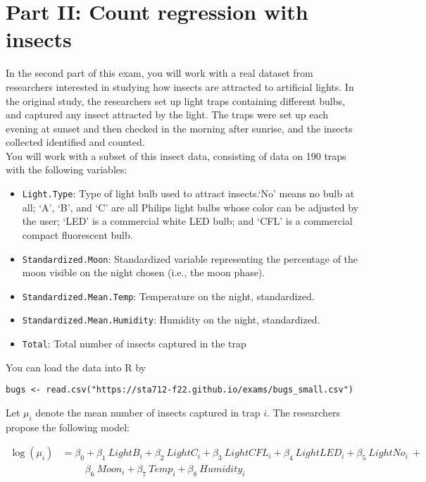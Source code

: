 \documentclass[11pt]{article}
\begin{document}
\newpage

\section*{Part II: Count regression with insects}

In the second part of this exam, you will work with a real dataset from researchers interested in studying how insects are attracted to artificial lights. In the original study, the researchers set up light traps containing different bulbs, and captured any insect attracted by the light. The traps were set up each evening at sunset and then checked in the morning after sunrise, and the insects collected identified and counted.\\

\noindent You will work with a subset of this insect data, consisting of data on 190 traps with the following variables:

\begin{itemize}
\item \verb;Light.Type;: Type of light bulb used to attract insects.`No' means no bulb at all; `A', `B', and `C' are all Philips light bulbs whose color can be adjusted by the user; `LED' is a commercial white LED bulb; and `CFL' is a commercial compact fluorescent bulb.

\item \verb;Standardized.Moon;: Standardized variable representing the percentage of the moon visible on the night chosen (i.e., the moon phase). 

\item \verb;Standardized.Mean.Temp;: Temperature on the night, standardized. 

\item \verb;Standardized.Mean.Humidity;: Humidity on the night, standardized. 

\item \verb;Total;: Total number of insects captured in the trap 
\end{itemize}

\noindent You can load the data into R by
\begin{verbatim}
bugs <- read.csv("https://sta712-f22.github.io/exams/bugs_small.csv")
\end{verbatim}

\noindent Let $\mu_i$ denote the mean number of insects captured in trap $i$. The researchers propose the following model:

\begin{align*}
\log(\mu_i) &= \beta_0 + \beta_1 \ LightB_i + \beta_2 \ LightC_i + \beta_3 \ LightCFL_i + \beta_4 \ LightLED_i + \beta_5 \ LightNo_i \ + \\
& \hspace{1cm} \beta_6 \ Moon_i + \beta_7 \ Temp_i + \beta_8 \ Humidity_i
\end{align*}
\end{document}
